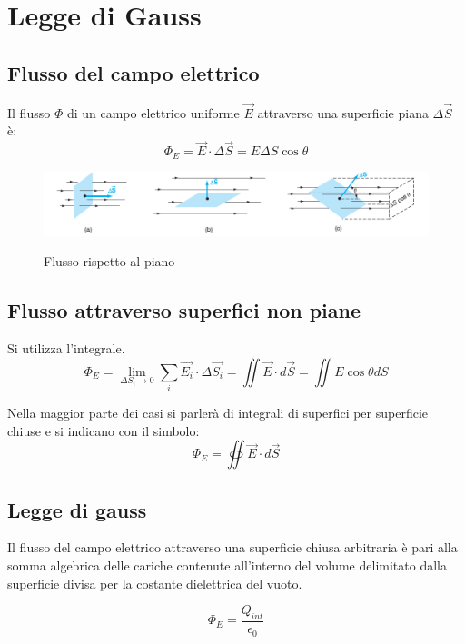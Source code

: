 \section{Legge di Gauss}

\subsection{Flusso del campo elettrico}
Il flusso $\Phi$ di un campo elettrico uniforme $\vec{E}$ attraverso una superficie piana $\Delta \vec{S}$ è:
\begin{equation}
    \Phi_E = \vec{E}\cdot \Delta\vec{S} = E\Delta S \cos\theta
\end{equation}
\begin{figure}[H]
    \centering
    \includegraphics[width=1\linewidth]{imgs/3 - flusso gauss.png}
    \label{fig:flusso}
    \caption{Flusso rispetto al piano}
\end{figure}

\subsection{Flusso attraverso superfici non piane}
Si utilizza l'integrale.
\begin{equation}
    \Phi_E = \lim_{\Delta S_i \to 0} \sum_i{\vec{E_i}\cdot\Delta\vec{S_i}} = \iint{\vec{E}\cdot d\vec{S}} = \iint{E \cos\theta dS}
\end{equation}

Nella maggior parte dei casi si parlerà di integrali di superfici per superficie chiuse
e si indicano con il simbolo:
\begin{equation*}
    \Phi_E = \oiint{\vec{E}\cdot d\vec{S}}
\end{equation*}

\subsection{Legge di gauss}
Il flusso del campo elettrico attraverso una superficie chiusa arbitraria è pari
alla somma algebrica delle cariche contenute all'interno del volume delimitato
dalla superficie divisa per la costante dielettrica del vuoto.

\begin{equation}
    \Phi_E = \frac{Q_{int}}{\epsilon_0}
\end{equation}

